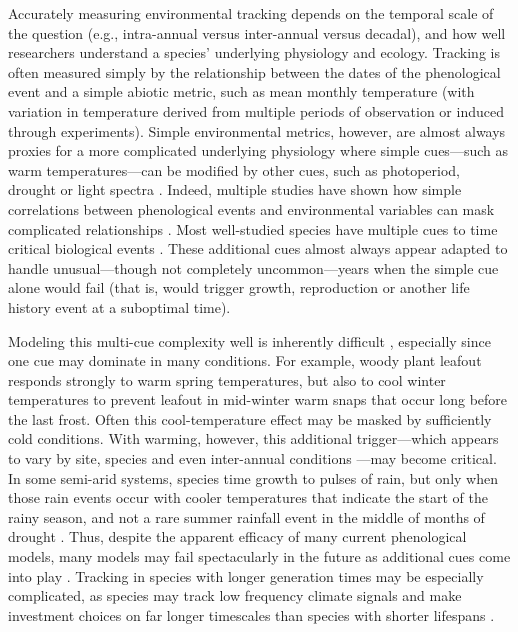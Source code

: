 \documentclass[11pt,letterpaper]{article}
\begin{document}
Accurately measuring environmental tracking depends on the temporal scale of the question (e.g., intra-annual versus inter-annual versus decadal), and how well researchers understand a species' underlying physiology and ecology. Tracking is often measured simply by the relationship between the dates of the phenological event and a simple abiotic metric, such as mean monthly temperature (with variation in temperature derived from multiple periods of observation or induced through experiments). Simple environmental metrics, however, are almost always proxies for a more complicated underlying physiology where simple cues---such as warm temperatures---can be modified by other cues, such as photoperiod, drought or light spectra \citep{Bagnall1993,Stinchcombe:2004ec}. Indeed, multiple studies have shown how simple correlations between phenological events and environmental variables can mask complicated relationships \citep{Cook:2012pnas,tansey2017}. Most well-studied species have multiple cues to time critical biological events \citep{chuinearees}. These additional cues almost always appear adapted to handle unusual---though not completely uncommon---years when the simple cue alone would fail (that is, would trigger growth, reproduction or another life history event at a suboptimal time). 

Modeling this multi-cue complexity well is inherently difficult \citep{chuine2016}, especially since one cue may dominate in many conditions. For example, woody plant leafout responds strongly to warm spring temperatures, but also to cool winter temperatures to prevent leafout in mid-winter warm snaps that occur long before the last frost. Often this cool-temperature effect may be masked by sufficiently cold conditions. With warming, however, this additional trigger---which appears to vary by site, species and even inter-annual conditions \citep{dennis2003}---may become critical. In some semi-arid systems, species time growth to pulses of rain, but only when those rain events occur with cooler temperatures that indicate the start of the rainy season, and not a rare summer rainfall event in the middle of months of drought \citep{Wainwright:2012tw,wainwright2013}. Thus, despite the apparent efficacy of many current phenological models, many models may fail spectacularly in the future as additional cues come into play \citep{chuine2016}. Tracking in species with longer generation times may be especially complicated, as species may track low frequency climate signals and make investment choices on far longer timescales than species with shorter lifespans \citep{morris2008}. 
\end{document}
